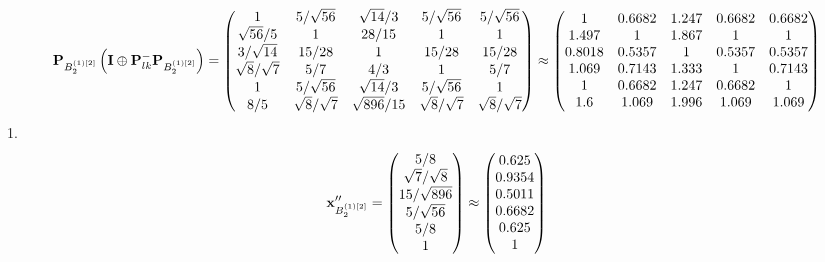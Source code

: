 \documentclass[10pt,a4paper]{article}
\begin{document}
	\[
		\bold{P}_{B_2^{(1)[2]}}\left(\bold{I} \oplus \bold{P}_{lk}^{-}\bold{P}_{B_2^{(1)[2]}}\right) = 
		\begin{pmatrix}
			{1}{} & {{5}} / {\sqrt{56}} & {\sqrt{14}} / {{3}} & {{5}} / {\sqrt{56}} & {{5}} / {\sqrt{56}} \\
			{\sqrt{56}} / {{5}} & {1}{} & {{28}} / {{15}} & {1}{} & {1}{} \\
			{{3}} / {\sqrt{14}} & {{15}} / {{28}} & {1}{} & {{15}} / {{28}} & {{15}} / {{28}} \\
			{\sqrt{8}} / {\sqrt{7}} & {{5}} / {{7}} & {{4}} / {{3}} & {1}{} & {{5}} / {{7}} \\
			{1}{} & {{5}} / {\sqrt{56}} & {\sqrt{14}} / {{3}} & {{5}} / {\sqrt{56}} & {1}{} \\
			{{8}} / {{5}} & {\sqrt{8}} / {\sqrt{7}} & {\sqrt{896}} / {{15}} & {\sqrt{8}} / {\sqrt{7}} & {\sqrt{8}} / {\sqrt{7}} \\
		\end{pmatrix}
		\approx
		\begin{pmatrix}
			1        & 0.6682   & 1.247    & 0.6682   & 0.6682   \\
			1.497    & 1        & 1.867    & 1        & 1        \\
			0.8018   & 0.5357   & 1        & 0.5357   & 0.5357   \\
			1.069    & 0.7143   & 1.333    & 1        & 0.7143   \\
			1        & 0.6682   & 1.247    & 0.6682   & 1        \\
			1.6      & 1.069    & 1.996    & 1.069    & 1.069    \\
		\end{pmatrix}
	\]
	1.
	\[
		\bold{x}''_{B_2^{(1)[2]}} = 
		\begin{pmatrix}
			{{5}} / {{8}} \\
			{\sqrt{7}} / {\sqrt{8}} \\
			{{15}} / {\sqrt{896}} \\
			{{5}} / {\sqrt{56}} \\
			{{5}} / {{8}} \\
			{1}{} \\
		\end{pmatrix}
		\approx
		\begin{pmatrix}
			0.625    \\
			0.9354   \\
			0.5011   \\
			0.6682   \\
			0.625    \\
			1        \\
		\end{pmatrix}
	\]
\end{document}
